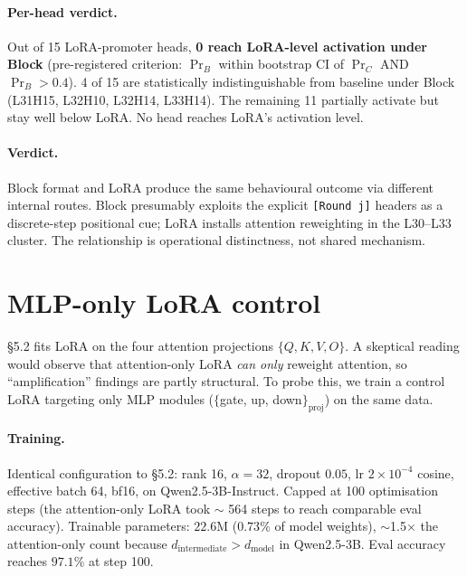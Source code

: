 \documentclass[letterpaper]{article} %
\begin{document}
\paragraph{Per-head verdict.}
Out of 15 LoRA-promoter heads, \textbf{0 reach LoRA-level
activation under Block} (pre-registered criterion:
$\Pr_B$ within bootstrap CI of $\Pr_C$ AND $\Pr_B > 0.4$). 4 of 15
are statistically indistinguishable from baseline under Block
(L31H15, L32H10, L32H14, L33H14). The remaining 11 partially
activate but stay well below LoRA. No head reaches LoRA's
activation level.

\paragraph{Verdict.} Block format and LoRA produce the same
behavioural outcome via different internal routes. Block presumably
exploits the explicit \texttt{[Round j]} headers as a discrete-step
positional cue; LoRA installs attention reweighting in the
L30--L33 cluster. The relationship is operational distinctness,
not shared mechanism.

\section{MLP-only LoRA control}
\label{app:mlp_lora}

\S5.2 fits LoRA on the four attention
projections $\{Q, K, V, O\}$. A skeptical reading would observe
that attention-only LoRA \emph{can only} reweight attention, so
``amplification'' findings are partly structural. To probe this,
we train a control LoRA targeting only MLP modules
($\{$gate, up, down$\}_{\text{proj}}$) on the same data.

\paragraph{Training.}
Identical configuration to \S5.2: rank 16,
$\alpha {=} 32$, dropout $0.05$, lr $2 \times 10^{-4}$ cosine,
effective batch 64, bf16, on Qwen2.5-3B-Instruct. Capped at 100
optimisation steps (the attention-only LoRA took $\sim$ 564 steps
to reach comparable eval accuracy). Trainable parameters: $22.6$M
($0.73\%$ of model weights), $\sim$1.5$\times$ the attention-only
count because $d_{\mathrm{intermediate}} > d_{\mathrm{model}}$ in
Qwen2.5-3B. Eval accuracy reaches $97.1\%$ at step 100.
\end{document}
